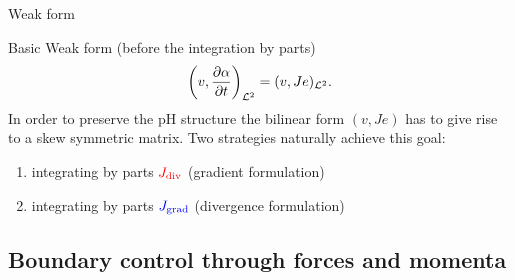 \documentclass{beamer}
\begin{document}
\begin{frame}{Weak form}

\begin{block}{Basic Weak form (before the integration by parts)}
\begin{equation*}
\left(v, \diffp{\alpha}{t}\right)_{\mathcal{L}^2} = (v, Je)_{\mathcal{L}^2}.
\end{equation*}
In order to preserve the pH structure the bilinear form $(v, Je)$ has to give rise to a skew symmetric matrix. Two strategies naturally achieve this goal:
\begin{enumerate}
\item<2-> integrating by parts $\textcolor{red}{J_{\text{div}}}$ (gradient formulation)
\item<3-> integrating by parts $\textcolor{blue}{J_{\text{grad}}}$ (divergence formulation)
\end{enumerate}
\end{block}


\end{frame}



\subsection{Boundary control through forces and momenta}
\end{document}
